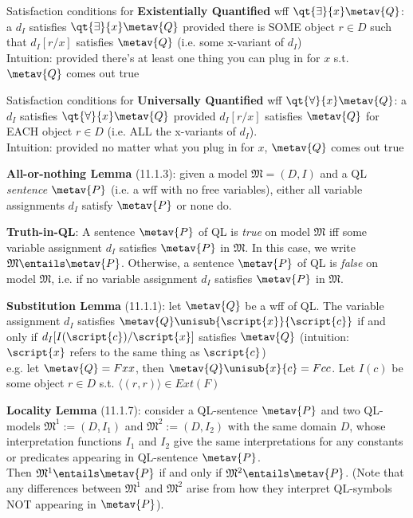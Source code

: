 Satisfaction conditions for \textbf{Existentially Quantified} wff $\qt{\exists}{x} \metav{Q}$: a $d_I$ satisfies $\qt{\exists}{x} \metav{Q}$ provided there is SOME object $r \in D$ such that $d_I [r/x]$ satisfies $\metav{Q}$ (i.e. some x-variant of $d_I$)\\ Intuition: provided there's at least one thing you can plug in for $x$ s.t. $\metav{Q}$ comes out true

Satisfaction conditions for \textbf{Universally Quantified} wff $\qt{\forall}{x} \metav{Q}$: a $d_I$ satisfies $\qt{\forall}{x} \metav{Q}$ provided $d_I [r/x]$ satisfies $\metav{Q}$ for EACH object $r \in D$ (i.e. ALL the x-variants of $d_I$). \\ Intuition: provided no matter what you plug in for $x$, $\metav{Q}$ comes out true

\textbf{All-or-nothing Lemma} (11.1.3): given a model $\mathfrak{M} = (D, I)$ and a QL \textit{sentence} $\metav{P}$ (i.e. a wff with no free variables), either all variable assignments $d_I$ satisfy $\metav{P}$ or none do.

\textbf{Truth-in-QL}: A sentence $\metav{P}$ of QL is \emph{true} on model $\mathfrak{M}$ iff some variable assignment $d_I$ satisfies $\metav{P}$ in $\mathfrak{M}$. In this case, we write $\mathfrak{M} \entails \metav{P}$. Otherwise, a sentence $\metav{P}$ of QL is \emph{false} on model $\mathfrak{M}$, i.e. if no variable assignment $d_I$ satisfies $\metav{P}$ in $\mathfrak{M}$.

\textbf{Substitution Lemma} (11.1.1): let $\metav{Q}$ be a wff of QL. The variable assignment $d_I$ satisfies $\metav{Q}\unisub{\script{x}}{\script{c}}$ if and only if $d_I [I(\script{c})/\script{x}]$ satisfies $\metav{Q}$ (intuition: $\script{x}$ refers to the same thing as $\script{c}$) \\ e.g. let $\metav{Q}=Fxx$, then $\metav{Q}\unisub{x}{c} = Fcc$. Let $I(c)$ be some object $r\in D$ s.t. $\langle (r,r) \rangle \in Ext(F)$

\textbf{Locality Lemma} (11.1.7): consider a QL-sentence $\metav{P}$ and two QL-models $\mathfrak{M}^1 := (D, I_1)$ and $\mathfrak{M}^2 := (D, I_2)$ with the same domain $D$, whose interpretation functions $I_1$ and $I_2$ give the same interpretations for any constants or predicates appearing in QL-sentence $\metav{P}$. \\ Then  $\mathfrak{M}^1 \entails \metav{P}$ if and only if $\mathfrak{M}^2 \entails \metav{P}$. (Note that any differences between $\mathfrak{M}^1$ and $\mathfrak{M}^2$ arise from how they interpret QL-symbols NOT appearing in $\metav{P}$).  


